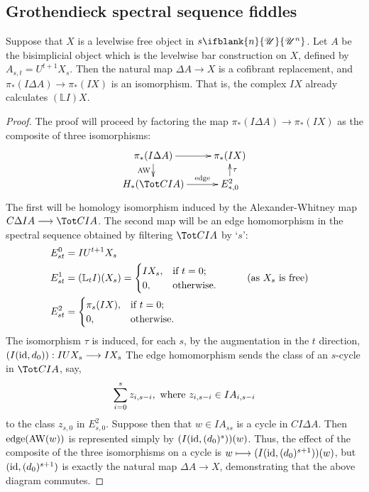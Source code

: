 \documentclass[10pt]{article}
\newcommand{\nontop}[1]{\ifblank{#1}{\scrU}{\scrU^{#1}}}
\newcommand{\derived}{\mathbb{L}}
\begin{document}
\begin{Frontmatters}
\tableofcontents\newpage
\end{Frontmatters}








\begin{GrothendieckSpectralSequencestake2}
\subsection{Grothendieck spectral sequence fiddles}
\begin{lem*}
Suppose that $X$ is a levelwise free object in $s\nontop{n}$. Let $A$ be the bisimplicial object which is the levelwise bar construction on $X$, defined by $A_{s,t}=U^{t+1}X_s$. Then the natural map $\Delta A\to X$ is a cofibrant replacement, and $\pi_*(I\Delta A)\to\pi_*(IX)$ is an isomorphism. That is, the complex $IX$ already calculates $(\derived I)X$.
\end{lem*}
\begin{proof}
The proof will proceed by factoring the map $\pi_*(I\Delta A)\to\pi_*(IX)$ as the composite of three isomorphisms:
\[\xymatrix@R=4mm{
\pi_*(I\Delta A)
\ar[r]_-{}
\ar[d]_-{\textup{AW}}
&%
\pi_*(IX)
\\%
H_*(\Tot CIA)\ar[r]^-{\textup{edge}}
&%
E^2_{*,0}\ar[u]_-{\tau}
}\]
The first will be homology isomorphism induced by the Alexander-Whitney map $C\Delta IA\to\Tot CIA$. The second map will be an edge homomorphism in the spectral sequence obtained by filtering $\Tot CIA$ by `$s$':
\begin{alignat*}{2}
E^0_{st}
&=
IU^{t+1}X_s%
\\
E^1_{st}
&=
(\derived_t I)(X_s)=\begin{cases}
IX_s,&\textup{if }t=0;\\
0,&\textup{otherwise}.
\end{cases}
&\qquad&\text{(as $X_s$ is free)}\\
E^2_{st}
&=
\begin{cases}
\pi_s(IX),&\textup{if }t=0;\\
0,&\textup{otherwise}.
\end{cases}
\end{alignat*}
The isomorphism $\tau$ is induced, for each $s$, by the augmentation in the $t$ direction, $(I(\textup{id},d_0)):IUX_s\to IX_s$ %
The edge homomorphism sends the class of an $s$-cycle in $\Tot CIA$, say,
\[\sum_{i=0}^s z_{i,s-i},\textup{ where }z_{i,s-i}\in IA_{i,s-i}\]
to the class $z_{s,0}$ in $E^2_{s,0}$. Suppose then that $w\in IA_{ss}$ is a cycle in $CI\Delta A$. Then $\textup{edge}(\textup{AW}(w))$ is represented simply by $(I(\textup{id},(d_0)^s))(w)$. Thus, the effect of the composite of the three isomorphisms on a cycle is $w\mapsto (I(\textup{id},(d_0)^{s+1}))(w)$, but $(\textup{id},(d_0)^{s+1})$ is exactly the natural map $\Delta A\to X$, demonstrating that the above diagram commutes.


\end{proof}
\end{GrothendieckSpectralSequencestake2}
\end{document}
